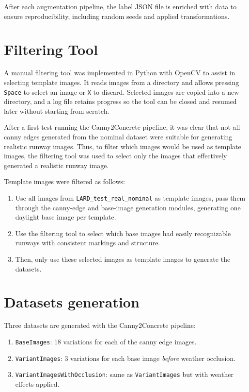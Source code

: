 After each augmentation pipeline, the label JSON file is enriched with data to ensure reproducibility, including random seeds and applied transformations.

\section{Filtering Tool}

A manual filtering tool was implemented in Python with OpenCV to assist in selecting template images. 
It reads images from a directory and allows pressing \texttt{Space} to select an image or \texttt{X} to discard. 
Selected images are copied into a new directory, and a log file retains progress so the tool can be closed and resumed later without starting from scratch.

After a first test running the Canny2Concrete pipeline, it was clear that not
all canny edges generated from the nominal dataset were suitable for generating
realistic runway images. Thus, to filter which images would be used as template
images, the filtering tool was used to select only the images that effectively
generated a realistic runway image.

Template images were filtered as follows:
\begin{enumerate}
\item Use all images from \texttt{LARD\_test\_real\_nominal} as template images, pass them through the canny-edge and base-image generation modules, generating one daylight base image per template.
\item Use the filtering tool to select which base images had easily recognizable runways with consistent markings and structure.
\item Then, only use these selected images as template images to generate the datasets.
\end{enumerate}

\section{Datasets generation}

Three datasets are generated with the Canny2Concrete pipeline:

\begin{enumerate}
\item \texttt{BaseImages}: 18 variations for each of the canny edge images.
\item \texttt{VariantImages}: 3 variations for each base image \emph{before} weather occlusion.
\item \texttt{VariantImagesWithOcclusion}: same as \texttt{VariantImages} but with weather effects applied.
\end{enumerate}

